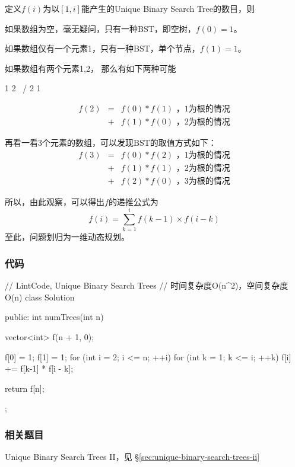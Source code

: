 定义$f(i)$为以$[1,i]$能产生的Unique Binary Search Tree的数目，则

如果数组为空，毫无疑问，只有一种BST，即空树，$f(0)=1$。

如果数组仅有一个元素{1}，只有一种BST，单个节点，$f(1)=1$。

如果数组有两个元素{1,2}， 那么有如下两种可能
\begin{Code}
1             2
  \          /
    2      1
\end{Code}

\begin{eqnarray}
f(2) &=& f(0) * f(1)   \text{ ，1为根的情况} \nonumber \\
     &+& f(1) * f(0)   \text{ ，2为根的情况} \nonumber
\end{eqnarray}

再看一看3个元素的数组，可以发现BST的取值方式如下：
\begin{eqnarray}
f(3) &=& f(0) * f(2)   \text{ ，1为根的情况} \nonumber \\
     &+& f(1) * f(1)   \text{ ，2为根的情况} \nonumber \\
     &+& f(2) * f(0)   \text{ ，3为根的情况} \nonumber
\end{eqnarray}

所以，由此观察，可以得出$f$的递推公式为
$$
f(i) = \sum_{k=1}^{i} f(k-1) \times f(i-k)
$$
至此，问题划归为一维动态规划。


\subsubsection{代码}

\begin{Code}
// LintCode, Unique Binary Search Trees
// 时间复杂度O(n^2)，空间复杂度O(n)
class Solution {
public:
    int numTrees(int n) {
        vector<int> f(n + 1, 0);

        f[0] = 1;
        f[1] = 1;
        for (int i = 2; i <= n; ++i) {
            for (int k = 1; k <= i; ++k)
                f[i] += f[k-1] * f[i - k];
        }

        return f[n];
    }
};
\end{Code}


\subsubsection{相关题目}
\begindot
\item Unique Binary Search Trees II，见 \S \ref{sec:unique-binary-search-trees-ii}
\myenddot


